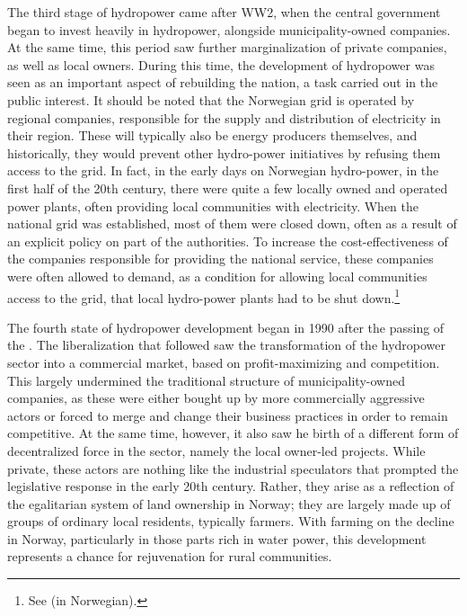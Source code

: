 The third stage of hydropower came after WW2, when the central government began to invest heavily in hydropower, alongside municipality-owned companies.  At the same time, this period saw further marginalization of private companies, as well as local owners. During this time, the development of hydropower was seen as an important aspect of rebuilding the nation, a task carried out in the public interest. It should be noted that the Norwegian grid is operated by regional companies, responsible for the supply and distribution of electricity in their region. These will typically also be energy producers themselves, and historically, they would prevent other hydro-power initiatives by refusing them access to the grid. In fact, in the early days on Norwegian hydro-power, in the first half of the 20th century, there were quite a few locally owned and operated power plants, often providing local communities with electricity. When the national grid was established, most of them were closed down, often as a result of an explicit policy on part of the authorities. To increase the cost-effectiveness of the companies responsible for providing the national service, these companies were often allowed to demand, as a condition for allowing local communities access to the grid, that local hydro-power plants had to be shut down.\footnote{See \cite[p.111]{Hindrum} (in Norwegian).}


The fourth state of hydropower development began in 1990 after the passing of the \cite{ea90}. The liberalization that followed saw the transformation of the hydropower sector into a commercial market, based on profit-maximizing and competition. This largely undermined the traditional structure of municipality-owned companies, as these were either bought up by more commercially aggressive actors or forced to merge and change their business practices in order to remain competitive. At the same time, however, it also saw he birth of a different form of decentralized force in the sector, namely the local owner-led projects. While private, these actors are nothing like the industrial speculators that prompted the legislative response in the early 20th century. Rather, they arise as a reflection of the egalitarian system of land ownership in Norway; they are largely made up of groups of ordinary local residents, typically farmers. With farming on the decline in Norway, particularly in those parts rich in water power, this development represents a chance for rejuvenation for rural communities. 

